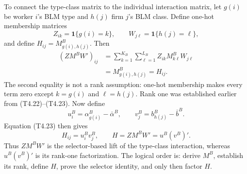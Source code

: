 \documentclass[11pt]{article}
\begin{document}
To connect the type-class matrix to the individual interaction matrix, let
\(g(i)\) be worker \(i\)'s BLM type and \(h(j)\) firm \(j\)'s BLM class.
Define one-hot membership matrices
\[
Z_{ik}=\mathbf{1}\{g(i)=k\},
\qquad
W_{j\ell}=\mathbf{1}\{h(j)=\ell\},
\tag{T4.23b}
\]
and define \(H_{ij}=M^B_{g(i),h(j)}\).  Then
\[
\begin{aligned}
(ZM^BW')_{ij}
&=\sum_{k=1}^{K_B}\sum_{\ell=1}^{L_B}
Z_{ik}M^B_{k\ell}W_{j\ell}\\
&=M^B_{g(i),h(j)}
=H_{ij}.
\end{aligned}
\tag{T4.23c}
\]
The second equality is not a rank assumption: one-hot membership makes every
term zero except \(k=g(i)\) and \(\ell=h(j)\).  Rank one was established
earlier from (T4.22)--(T4.23).  Now define
\[
u_i^B=\alpha_{g(i)}^B-\bar\alpha^B,
\qquad
v_j^B=b_{h(j)}^B-\bar b^B.
\tag{T4.23d}
\]
Equation (T4.23) then gives
\[
H_{ij}=u_i^Bv_j^B,
\qquad
\boxed{H=ZM^BW'=u^B(v^B)'.}
\tag{T4.23e}
\]
Thus \(ZM^BW'\) is the selector-based lift of the type-class interaction,
whereas \(u^B(v^B)'\) is its rank-one factorization.  The logical order is:
derive \(M^B\), establish its rank, define \(H\), prove the selector identity,
and only then factor \(H\).
\end{document}
